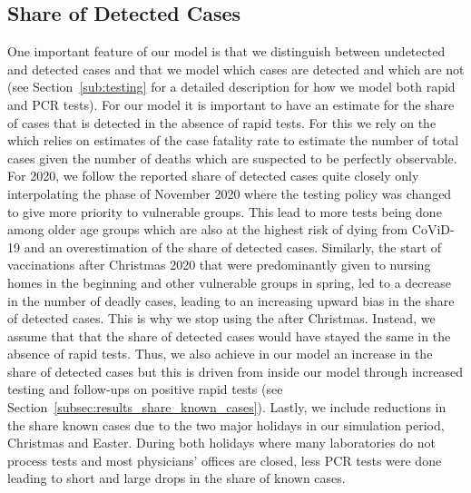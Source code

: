 \subsection{Share of Detected Cases}
\label{subsec:data_share_known_cases}


One important feature of our model is that we distinguish between undetected and detected
cases and that we model which cases are detected and which are not (see
Section~\ref{sub:testing} for a detailed description for how we model both rapid and PCR
tests). For our model it is important to have an estimate for the share of cases that is
detected in the absence of rapid tests. For this we rely on the
\citet{Dunkelzifferradar2020} which relies on estimates
of the case fatality rate to estimate the number of total cases given the number of
deaths which are suspected to be perfectly observable. For 2020, we follow the reported
share of detected cases quite closely only interpolating the phase of November 2020 where
the testing policy was changed to give more priority to vulnerable groups. This lead to
more tests being done among older age groups which are also at the highest risk of dying
from CoViD-19 and an overestimation of the share of detected cases.%
Similarly, the start of vaccinations after Christmas 2020 that were predominantly given
to nursing homes in the beginning and other vulnerable groups in spring, led to a
decrease in the number of deadly cases, leading to an increasing upward bias in the share
of detected cases. This is why we stop using the \citet{Dunkelzifferradar2020} after Christmas.
Instead, we assume that that the share of detected cases would have stayed the same in
the absence of rapid tests. Thus, we also achieve in our model an increase in the share
of detected cases but this is driven from inside our model through increased testing and
follow-ups on positive rapid tests (see Section~\ref{subsec:results_share_known_cases}).
Lastly, we include reductions in the share known cases due to the two major holidays in
our simulation period, Christmas and Easter. During both holidays where many laboratories
do not process tests and most physicians' offices are closed, less PCR tests were done
leading to short and large drops in the share of known cases.

